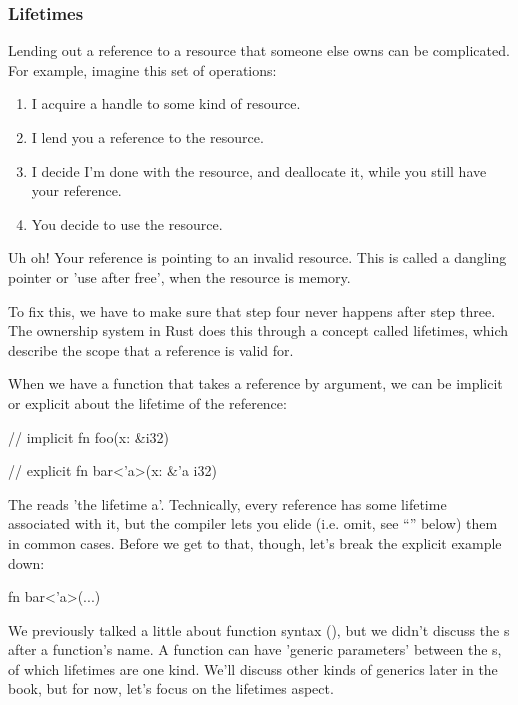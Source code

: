 \subsubsection*{Lifetimes}

Lending out a reference to a resource that someone else owns can be complicated. For example, imagine this set of operations:

\begin{enumerate}
  \item{I acquire a handle to some kind of resource.}
  \item{I lend you a reference to the resource.}
  \item{I decide I'm done with the resource, and deallocate it, while you still have your reference.}
  \item{You decide to use the resource.}
\end{enumerate}

Uh oh! Your reference is pointing to an invalid resource. This is called a dangling pointer or 'use after free', when the resource 
is memory.

\blank

To fix this, we have to make sure that step four never happens after step three. The ownership system in Rust does this through a 
concept called lifetimes, which describe the scope that a reference is valid for.

\blank

When we have a function that takes a reference by argument, we can be implicit or explicit about the lifetime of the reference:

\begin{rustc}
// implicit
fn foo(x: &i32) {
}

// explicit
fn bar<'a>(x: &'a i32) {
}
\end{rustc}

The  reads 'the lifetime a'. Technically, every reference has some lifetime associated with it, but the compiler lets 
you elide (i.e. omit, see \enquote{} below) them in common cases. Before we get to that, though, let's break the explicit 
example down:

\begin{rustc}
fn bar<'a>(...)
\end{rustc}

We previously talked a little about function syntax (), but we didn't discuss the \code{<>}s after 
a function's name. A function can have 'generic parameters' between the \code{<>}s, of which lifetimes are one kind. We'll discuss 
other kinds of generics later in the book, but for now, let's focus on the lifetimes aspect.

